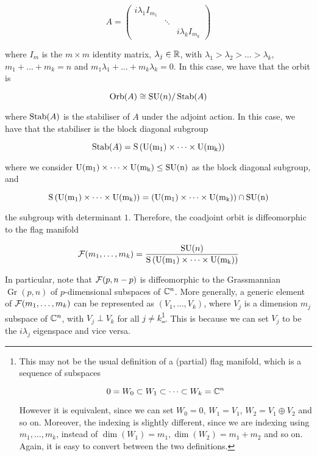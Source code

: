 \documentclass{article}
\DeclareMathOperator{\SU}{SU}
\DeclareMathOperator{\Gr}{Gr}
\begin{document}
\[A = \begin{pmatrix}
    i\lambda_1 I_{m_1} \\
    & \ddots \\
    & & i\lambda_k I_{m_k}
\end{pmatrix}\]

where \(I_m\) is the \(m \times m\) identity matrix, \(\lambda_j \in \mathbb{R}\), with \(\lambda_1 > \lambda_2 > \dots > \lambda_k\), \(m_1 + \dots + m_k = n\) and \(m_1\lambda_1 + \dots + m_k\lambda_k = 0\). In this case, we have that the orbit is

\[\Orb(A) \cong \SU(n)/\Stab(A)\]

where \(\operatorname{Stab}(A)\) is the stabiliser of \(A\) under the adjoint action. In this case, we have that the stabiliser is the block diagonal subgroup

\[\operatorname{Stab}(A) = \rm S\left(\rm U(m_1) \times \dots \times \rm U(m_k)\right)\]

where we consider \(\rm U(m_1) \times \cdots \times \rm U(m_k) \le \SU(n)\) as the block diagonal subgroup, and

\[\rm S\left(\rm U(m_1) \times \dots \times \rm U(m_k)\right) = \left(\rm U(m_1) \times \cdots \times \rm U(m_k)\right) \cap \SU(n)\]

the subgroup with determinant \(1\). Therefore, the coadjoint orbit is diffeomorphic to the flag manifold

\[\mcF(m_1, \dots, m_k) = \frac{\SU(n)}{\rm S\left(\rm U(m_1) \times \cdots \times \rm U(m_k)\right)}\]

In particular, note that \(\mathcal{F}(p, n-p)\) is diffeomorphic to the Grassmannian \(\Gr(p, n)\) of \(p\)-dimensional subspaces of \(\mathbb{C}^n\). More generally, a generic element of \(\mathcal{F}(m_1, \dots, m_k)\) can be represented as \((V_1, \dots, V_k)\), where \(V_j\) is a dimension \(m_j\) subspace of \(\mathbb{C}^n\), with \(V_j \perp V_k\) for all \(j \ne k\)\footnote{This may not be the usual definition of a (partial) flag manifold, which is a sequence of subspaces 

\[0 = W_0 \subset W_1 \subset \cdots \subset W_k = \mathbb{C}^n\]

However it is equivalent, since we can set \(W_0 = 0\), \(W_1 = V_1\), \(W_2 = V_1 \oplus V_2\) and so on. Moreover, the indexing is slightly different, since we are indexing using \(m_1, \dots, m_k\), instead of \(\dim(W_1) = m_1, \dim(W_2) = m_1 + m_2\) and so on. Again, it is easy to convert between the two definitions.}. This is because we can set \(V_j\) to be the \(i\lambda_j\) eigenspace and vice versa.
\end{document}
